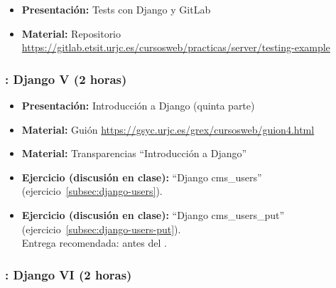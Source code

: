 \documentclass[a4paper,12pt]{article}
\begin{document}
\begin{itemize}
 \item \textbf{Presentación:} Tests con Django y GitLab
  \item \textbf{Material:} Repositorio \url{https://gitlab.etsit.urjc.es/cursosweb/practicas/server/testing-example}
\end{itemize}


\subsubsection{\juevesK: Django V (2 horas)}
\label{cal:juevesK}

\begin{itemize}
 \item \textbf{Presentación:} Introducción a Django (quinta parte)
 \item \textbf{Material:} Guión \url{https://gsyc.urjc.es/grex/cursosweb/guion4.html}
 \item \textbf{Material:} Transparencias ``Introducción a Django''
 \item \textbf{Ejercicio (discusión en clase):} ``Django cms\_users'' (ejercicio~\ref{subsec:django-users}).
 \item \textbf{Ejercicio (discusión en clase):} ``Django cms\_users\_put'' (ejercicio~\ref{subsec:django-users-put}). \\
  Entrega recomendada: antes del \juevesL.
\end{itemize}

\subsubsection{\juevesL: Django VI (2 horas)}
\label{cal:juevesL}
\end{document}
